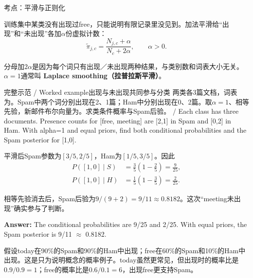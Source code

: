 

考点：平滑与正则化

训练集中某类没有出现过free，只能说明有限记录里没见到。加法平滑给“出现”和“未出现”各加\(\alpha\)份虚拟计数：
\[
\tilde\pi_{j,c}=\frac{N_{j,c}+\alpha}{N_c+2\alpha},\qquad\alpha>0.
\tag{2.26}
\]


分母加\(2\alpha\)是因为每个词只有出现／未出现两种结果，与类别数和词表大小无关。\(\alpha=1\)通常叫 \textbf{Laplace smoothing（拉普拉斯平滑）}。


\begin{StudyBlock}{完整示范 / Worked example}{出现与未出现共同参与分类}
两类各3篇文档，词表为。Spam中两个词分别出现在2、1篇；Ham中分别出现在0、2篇。取\(\alpha=1\)、相等先验，新邮件布尔向量为\StudyInline{[1,\allowbreak{}0]}。求类条件概率与Spam后验。 / Each class has three documents. Presence counts for [free, meeting] are [2,1] in Spam and [0,2] in Ham. With alpha=1 and equal priors, find both conditional probabilities and the Spam posterior for [1,0].


平滑后Spam参数为\([3/5,2/5]\)，Ham为\([1/5,3/5]\)。因此
\[
\begin{aligned}
P([1,0]\mid S)&=\frac35\left(1-\frac25\right)=\frac9{25},\\
P([1,0]\mid H)&=\frac15\left(1-\frac35\right)=\frac2{25}.
\end{aligned}
\tag{2.27}
\]


相等先验消去后，Spam后验为\(9/(9+2)=9/11\approx0.8182\)。这次“meeting未出现”确实参与了判断。


\textbf{Answer:} The conditional probabilities are 9/25 and 2/25. With equal priors, the Spam posterior is 9/11 \ensuremath{\approx} 0.8182.
\end{StudyBlock}



假设today在90\%的Spam和90\%的Ham中出现；free在60\%的Spam和10\%的Ham中出现。这是只为说明概念的概率例子。today虽然更常见，但出现时的概率比是\(0.9/0.9=1\)；free的概率比是\(0.6/0.1=6\)，出现free更支持Spam。


